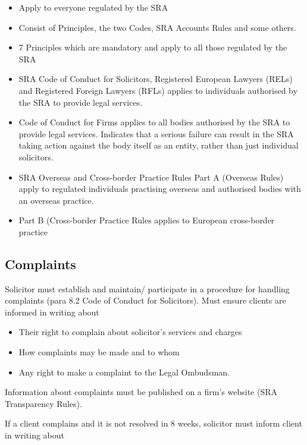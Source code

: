 \documentclass[
]{article}
\providecommand{\tightlist}{%
  \setlength{\itemsep}{0pt}\setlength{\parskip}{0pt}}
\begin{document}
\begin{itemize}
\tightlist
\item
  Apply to everyone regulated by the SRA
\item
  Consist of Principles, the two Codes, SRA Accounts Rules and some
  others.
\item
  7 Principles which are mandatory and apply to all those regulated by
  the SRA
\item
  SRA Code of Conduct for Solicitors, Registered European Lawyers (RELs)
  and Registered Foreign Lawyers (RFLs) applies to individuals
  authorised by the SRA to provide legal services.
\item
  Code of Conduct for Firms applies to all bodies authorised by the SRA
  to provide legal services. Indicates that a serious failure can result
  in the SRA taking action against the body itself as an entity, rather
  than just individual solicitors.
\item
  SRA Overseas and Cross-border Practice Rules Part A (Overseas Rules)
  apply to regulated individuals practising overseas and authorised
  bodies with an overseas practice.
\item
  Part B (Cross-border Practice Rules applies to European cross-border
  practice
\end{itemize}

\hypertarget{complaints}{%
\subsection{Complaints}\label{complaints}}

Solicitor must establish and maintain/ participate in a procedure for
handling complaints (para 8.2 Code of Conduct for Solicitors). Must
ensure clients are informed in writing about

\begin{itemize}
\tightlist
\item
  Their right to complain about solicitor's services and charges
\item
  How complaints may be made and to whom
\item
  Any right to make a complaint to the Legal Ombudsman.
\end{itemize}

Information about complaints must be published on a firm's website (SRA
Transparency Rules).

If a client complains and it is not resolved in 8 weeks, solicitor must
inform client in writing about
\end{document}
